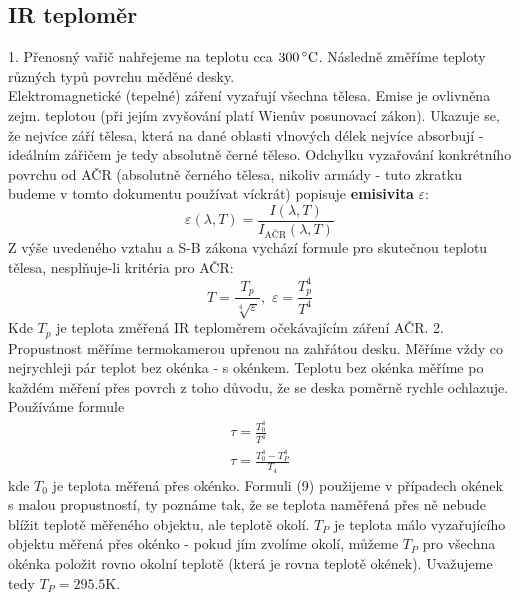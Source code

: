 \documentclass[czech,11pt,a4paper]{article}
\begin{document}
	\subsection{IR teploměr}
	1. Přenosný vařič nahřejeme na teplotu cca  $300 \, ^\circ \rm C$. Následně změříme teploty různých typů povrchu měděné desky. \\
	Elektromagnetické (tepelné) záření vyzařují všechna tělesa. Emise je ovlivněna zejm. teplotou (při jejím zvyšování platí Wienův posunovací zákon). Ukazuje se, že nejvíce září tělesa, která na dané oblasti vlnových délek nejvíce absorbují - ideálním zářičem je tedy absolutně černé těleso. Odchylku vyzařování konkrétního povrchu od AČR (absolutně černého tělesa, nikoliv armády - tuto zkratku budeme v tomto dokumentu používat víckrát) popisuje \textbf{emisivita} $\varepsilon$:
	\begin{equation}
		\varepsilon (\lambda, T) = \frac {I(\lambda, T)}{I_{\text{AČR}} (\lambda, T)}
	\end{equation}
	Z výše uvedeného vztahu a S-B zákona vychází formule pro skutečnou teplotu tělesa, nesplňuje-li kritéria pro AČR:
	\begin{equation}
		T = \frac {T_p}{\sqrt[4]{\varepsilon}},\, \, \varepsilon = \frac{T_p^4}{T^4}
	\end{equation}
	Kde $T_p$ je teplota změřená IR teploměrem očekávajícím záření AČR.
	2. Propustnost měříme termokamerou upřenou na zahřátou desku. Měříme vždy co nejrychleji pár teplot bez okénka - s okénkem. Teplotu bez okénka měříme po každém měření přes povrch z toho důvodu, že se deska poměrně rychle ochlazuje. Používáme formule 
	\begin{gather}
		\tau = \frac{T^4_0}{T^4} \\
		\tau = \frac {T^4_0 - T^4_P}{T_4}
	\end{gather}
	kde $T_0$ je teplota měřená přes okénko. Formuli (9) použijeme v případech okének s malou propustností, ty poznáme tak, že se teplota naměřená přes ně nebude blížit teplotě měřeného objektu, ale teplotě okolí. $T_P$ je teplota málo vyzařujícího objektu měřená přes okénko - pokud jím zvolíme okolí, můžeme $T_P$ pro všechna okénka položit rovno okolní teplotě (která je rovna teplotě okének). Uvažujeme tedy $T_P = 295.5$K. 
	\\ \\ \\ \\ \\ \\ \\ \\ \\ \\ \\
\end{document}
